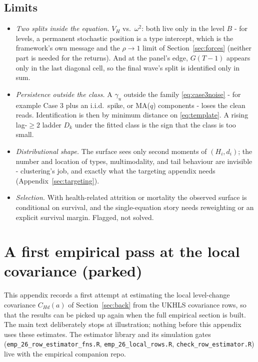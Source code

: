 \documentclass[11pt]{article}
\theoremstyle{remark}
\begin{document}
\subsection*{Limits}

\begin{itemize}
\item \emph{Two splits inside the equation.} $V_H$ vs.\ $\omega^2$: both live only in the level $B$ - for levels, a permanent stochastic position is a type intercept, which is the framework's own message and the $\rho\to1$ limit of Section~\ref{sec:forces} (neither part is needed for the returns).
And at the panel's edge, $G(T-1)$ appears only in the last diagonal cell, so the final wave's split is identified only in sum.
\item \emph{Persistence outside the class.} A $\gamma_u$ outside the family \eqref{eq:case3noise} - for example Case 3 plus an i.i.d.\ spike, or MA($q$) components - loses the clean reads.
Identification is then by minimum distance on \eqref{eq:template}.
A rising lag-$\ge2$ ladder $D_k$ under the fitted class is the sign that the class is too small.
\item \emph{Distributional shape.} The surface sees only second moments of $(H_i,d_i)$; the number and location of types, multimodality, and tail behaviour are invisible - clustering's job, and exactly what the targeting appendix needs (Appendix~\ref{sec:targeting}).
\item \emph{Selection.} With health-related attrition or mortality the observed surface is conditional on survival, and the single-equation story needs reweighting or an explicit survival margin.
Flagged, not solved.
\end{itemize}



\section{A first empirical pass at the local covariance (parked)}\label{app:localpass}

This appendix records a first attempt at estimating the local level-change covariance $C_{Hd}(a)$ of Section~\ref{sec:back} from the UKHLS covariance rows, so that the results can be picked up again when the full empirical section is built.
The main text deliberately stops at illustration; nothing before this appendix uses these estimates.
The estimator library and its simulation gates (\texttt{emp\_26\_row\_estimator\_fns.R}, \texttt{emp\_26\_local\_rows.R}, \texttt{check\_row\_estimator.R}) live with the empirical companion repo.
\end{document}
